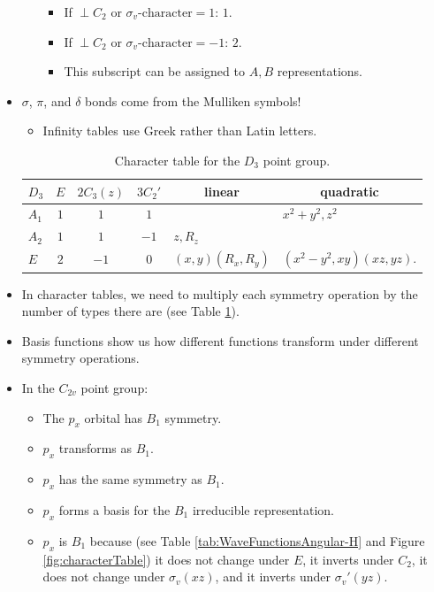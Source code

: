 \documentclass[../notes.tex]{subfiles}
\begin{document}
\begin{itemize}
\begin{itemize}
\begin{itemize}
            \item If $\perp C_2\text{ or }\sigma_v\text{-character}=1$: $1$.
            \item If $\perp C_2\text{ or }\sigma_v\text{-character}=-1$: $2$.
            \item This subscript can be assigned to $A,B$ representations.
        \end{itemize}
    \end{itemize}
    \item $\sigma$, $\pi$, and $\delta$ bonds come from the Mulliken symbols!
    \begin{itemize}
        \item Infinity tables use Greek rather than Latin letters.
    \end{itemize}
    \begin{table}[h!]
        \centering
        \renewcommand{\arraystretch}{1.2}
        \small
        \begin{tabular}{l|ccc|l|l}
            $D_3$ & $E$ & $2C_3(z)$ & $3C_2'$ & \multicolumn{1}{c|}{linear} & \multicolumn{1}{c}{quadratic}\\
            \hline
            $A_1$ & $1$ & $1$ & $1$ & & $x^2+y^2,z^2$\\
            $A_2$ & $1$ & $1$ & $-1$ & $z,R_z$ & \\
            $E$ & $2$ & $-1$ & $0$ & $(x,y)(R_x,R_y)$ & $(x^2-y^2,xy)(xz,yz)$.
        \end{tabular}
        \caption{Character table for the $D_3$ point group.}
        \label{tab:characterTable-D3}
    \end{table}
    \item In character tables, we need to multiply each symmetry operation by the number of types there are (see Table \ref{tab:characterTable-D3}).
    \item Basis functions show us how different functions transform under different symmetry operations.
    \item In the $C_{2v}$ point group:
    \begin{itemize}
        \item The $p_x$ orbital has $B_1$ symmetry.
        \item $p_x$ transforms as $B_1$.
        \item $p_x$ has the same symmetry as $B_1$.
        \item $p_x$ forms a basis for the $B_1$ irreducible representation.
        \item $p_x$ is $B_1$ because (see Table \ref{tab:WaveFunctionsAngular-H} and Figure \ref{fig:characterTable}) it does not change under $E$, it inverts under $C_2$, it does not change under $\sigma_v(xz)$, and it inverts under $\sigma_v'(yz)$.

\end{itemize}
\end{itemize}
\end{document}
